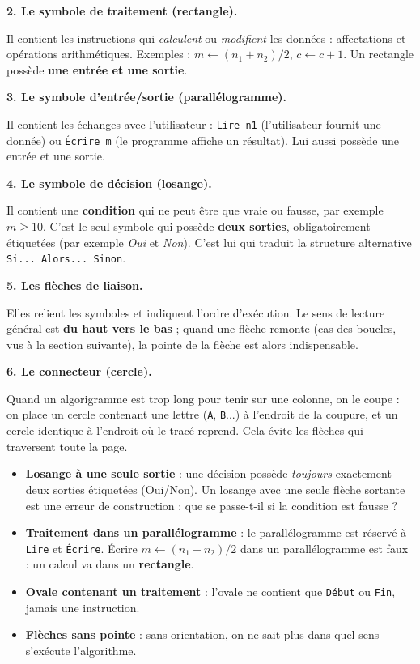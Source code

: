 \documentclass[11pt]{article}
\begin{document}
\textbf{2. Le symbole de traitement (rectangle).}\par
Il contient les instructions qui \emph{calculent} ou \emph{modifient} les données : affectations et opérations arithmétiques. Exemples : $m \leftarrow (n_1 + n_2)/2$, $c \leftarrow c + 1$. Un rectangle possède \textbf{une entrée et une sortie}.

\textbf{3. Le symbole d'entrée/sortie (parallélogramme).}\par
Il contient les échanges avec l'utilisateur : \texttt{Lire n1} (l'utilisateur fournit une donnée) ou \texttt{Écrire m} (le programme affiche un résultat). Lui aussi possède une entrée et une sortie.

\textbf{4. Le symbole de décision (losange).}\par
Il contient une \textbf{condition} qui ne peut être que vraie ou fausse, par exemple $m \geq 10$. C'est le seul symbole qui possède \textbf{deux sorties}, obligatoirement étiquetées (par exemple \emph{Oui} et \emph{Non}). C'est lui qui traduit la structure alternative \texttt{Si... Alors... Sinon}.

\textbf{5. Les flèches de liaison.}\par
Elles relient les symboles et indiquent l'ordre d'exécution. Le sens de lecture général est \textbf{du haut vers le bas} ; quand une flèche remonte (cas des boucles, vus à la section suivante), la pointe de la flèche est alors indispensable.

\textbf{6. Le connecteur (cercle).}\par
Quand un algorigramme est trop long pour tenir sur une colonne, on le coupe : on place un cercle contenant une lettre (\texttt{A}, \texttt{B}...) à l'endroit de la coupure, et un cercle identique à l'endroit où le tracé reprend. Cela évite les flèches qui traversent toute la page.

\begin{attention}
\begin{itemize}
\item \textbf{Losange à une seule sortie} : une décision possède \emph{toujours} exactement deux sorties étiquetées (Oui/Non). Un losange avec une seule flèche sortante est une erreur de construction : que se passe-t-il si la condition est fausse ?
\item \textbf{Traitement dans un parallélogramme} : le parallélogramme est réservé à \texttt{Lire} et \texttt{Écrire}. Écrire $m \leftarrow (n_1+n_2)/2$ dans un parallélogramme est faux : un calcul va dans un \textbf{rectangle}.
\item \textbf{Ovale contenant un traitement} : l'ovale ne contient que \texttt{Début} ou \texttt{Fin}, jamais une instruction.
\item \textbf{Flèches sans pointe} : sans orientation, on ne sait plus dans quel sens s'exécute l'algorithme.
\end{itemize}
\end{attention}
\end{document}
